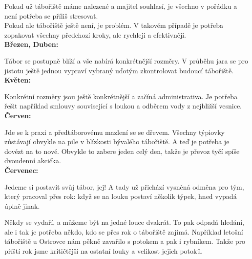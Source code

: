 Pokud už tábořiště máme nalezené a majitel souhlasí, je všechno v pořádku a není potřeba se příliš stresovat.\\
Pokud ale tábořiště ještě není, je problém. V takovém případě je potřeba zopakovat všechny předchozí kroky, ale rychleji a efektivněji.\\
\textbf{Březen, Duben:}

Tábor se postupně blíží a vše nabírá konkrétnější rozměry. V průběhu jara se pro jistotu ještě jednou vypraví vybraný uďotým zkontrolovat budoucí tábořiště.\\
\textbf{Květen:}

Konkrétní rozměry jsou ještě konkrétnější a začíná administrativa. Je potřeba řešit například smlouvy související s loukou a odběrem vody z nejbližší vesnice.\\
\textbf{Červen:}

Jde se k praxi a předtáborovému mazlení se se dřevem. Všechny týpiovky zůstávají obvykle na pile v blízkosti bývalého tábořiště. A teď je potřeba je dovézt na to nové. 
Obvykle to zabere jeden celý den, takže je převoz tyčí spíše dvoudenní akcička.\\
\textbf{Červenec:}

Jedeme si postavit svůj tábor, jej!
A tady už přichází vysněná odměna pro tým, který pracoval přes rok: když se na louku postaví několik týpek, hned vypadá úplně jinak.

Někdy se vydaří, a můžeme být na jedné louce dvakrát. To pak odpadá hledání, ale i tak je potřeba někdo, kdo se přes rok o tábořiště zajímá.
Například letošní tábořiště u Ostrovce nám pěkně zavařilo s potokem a pak i rybníkem. Takže pro příští rok jsme kritičtější na ostatní louky a velikost jejich potoků.


